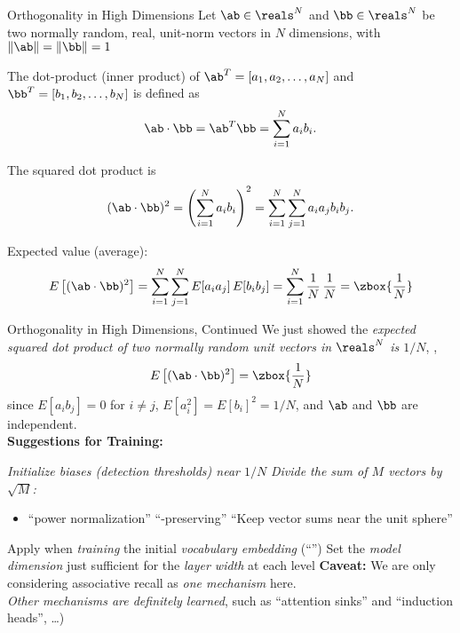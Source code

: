 
\begin{slide}[\slideopts,toc={Orthogonality}]{Orthogonality in High Dimensions}
\vspace{-1em}
% 
Let $\ab\in\reals^N$ and $\bb\in\reals^N$ be two normally random, real, unit-norm vectors in $N$ dimensions,
with $\|\ab\|=\|\bb\|=1$

\maybepause
The dot-product (inner product) of
$\ab^T=[a_1,a_2,\ldots,a_N]$ and
$\bb^T=[b_1,b_2,\ldots,b_N]$ is defined as
\[
\ab \cdot \bb = \ab^T\bb = \sum_{i=1}^{N} a_i b_i.
\]

\maybepause
The squared dot product is
\[
(\ab \cdot \bb)^2 = \left(\sum_{i=1}^{N} a_i b_i\right)^2 = \sum_{i=1}^{N} \sum_{j=1}^{N} a_i a_j b_i b_j.
\]

\maybepause
Expected value (average):
\[
E\left[(\ab \cdot \bb)^2\right]
= \sum_{i=1}^{N} \sum_{j=1}^{N} E[a_i a_j] \, E[b_i b_j]
= \sum_{i=1}^{N} \frac{1}{N}\,\frac{1}{N}
= \zbox{\frac{1}{N}}
\]
\end{slide}

\begin{slide}[\slideopts,toc={}]{Orthogonality in High Dimensions, Continued}
\vspace{-1em}
We just showed the \emph{expected squared dot product of two normally random unit vectors in $\reals^N$ is $1/N$}, \ie,
\[
E\left[(\ab \cdot \bb)^2\right] = \zbox{\frac{1}{N}}
\]
since $E[a_i b_j]=0$ for $i \ne j$, $E[a_i^2] = E[b_i]^2 = 1/N$, and $\ab$ and $\bb$ are independent.\\
\maybepause
\textbf{Suggestions for Training:}
\begin{itemize}
\mpitem \emph{Initialize biases (detection thresholds) near $1/N$}
\mpitem \emph{Divide the sum of $M$ vectors by $\sqrt{M}$:}
\begin{itemize}
  \item ``power normalization''
  \mpitem ``-preserving''
  \mpitem ``Keep vector sums near the unit sphere''
\end{itemize}
\mpitem Apply  when \emph{training} the initial \emph{vocabulary embedding} (``'')
\mpitem Set the \emph{model dimension} just sufficient for the \emph{layer width} at each level
\mpitem \textbf{Caveat:} We are only considering associative recall as \emph{one mechanism} here.\\
          \emph{Other mechanisms are definitely learned}, such as ``attention sinks'' and ``induction heads'', \ldots)
\end{itemize}

\end{slide}

